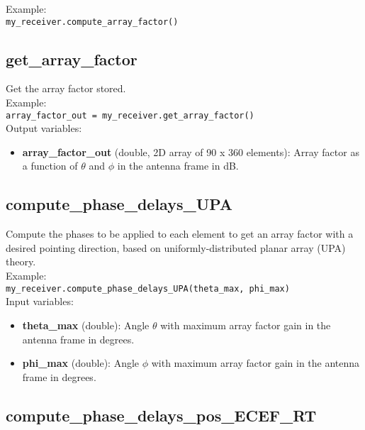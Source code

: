 Example:\\

\texttt{my\_receiver.compute\_array\_factor()}\\



\subsection{get\_array\_factor}

Get the array factor stored.\\

Example:\\

\texttt{array\_factor\_out = my\_receiver.get\_array\_factor()}\\

Output variables:
\begin{itemize}
\item {\bf array\_factor\_out} (double, 2D array of 90 x 360 elements): Array factor as a function of $\theta$ and $\phi$ in the antenna frame in dB.
\end{itemize}


\subsection{compute\_phase\_delays\_UPA}

Compute the phases to be applied to each element to get an array factor with a desired pointing direction, based on uniformly-distributed planar array (UPA) theory.\\

Example:\\

\texttt{my\_receiver.compute\_phase\_delays\_UPA(theta\_max, phi\_max)}\\

Input variables:
\begin{itemize}
\item {\bf theta\_max} (double): Angle $\theta$ with maximum array factor gain in the antenna frame in degrees.
\item {\bf phi\_max} (double): Angle $\phi$ with maximum array factor gain in the antenna frame in degrees.
\end{itemize}


\subsection{compute\_phase\_delays\_pos\_ECEF\_RT}

